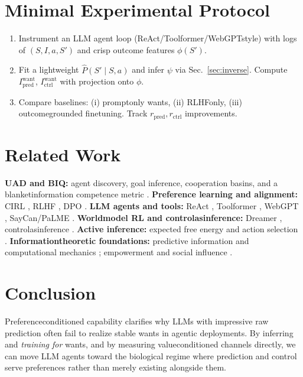 \documentclass[11pt]{article}
\begin{document}
\section{Minimal Experimental Protocol}
\label{sec:protocol}
\begin{enumerate}[leftmargin=2em]
  \item Instrument an LLM agent loop (ReAct/Toolformer/WebGPT\textendash style) with logs of $(S,I,a,S')$ and crisp outcome features $\phi(S')$.
  \item Fit a lightweight $\widehat P(S'\mid S,a)$ and infer $\psi$ via Sec.~\ref{sec:inverse}. Compute $I^{\text{want}}_{\mathrm{pred}}$, $I^{\text{want}}_{\mathrm{ctrl}}$ with projection onto $\phi$.
  \item Compare baselines: (i) prompt\textendash only wants, (ii) RLHF\textendash only, (iii) outcome\textendash grounded fine\textendash tuning. Track $r_{\mathrm{pred}}, r_{\mathrm{ctrl}}$ improvements.
\end{enumerate}

\section{Related Work}
\label{sec:related}
\textbf{UAD and B\textendash IQ:} agent discovery, goal inference, cooperation basins, and a blanket\textendash information competence metric \citep{ZarnckeUAD, ZarnckeAttractors, ZarnckeAcausal, ZarnckeBIQ}.\newline
\textbf{Preference learning and alignment:} CIRL \citep{HadfieldMenell2016}, RLHF \citep{Christiano2017}, DPO \citep{Rafailov2023}.\newline
\textbf{LLM agents and tools:} ReAct \citep{Yao2023}, Toolformer \citep{Schick2023}, WebGPT \citep{Nakano2021}, SayCan/PaLM\textendash E \citep{Ahn2022, Driess2023}.\newline
\textbf{World\textendash model RL and control\textendash as\textendash inference:} Dreamer \citep{Hafner2019, Hafner2023}, control\textendash as\textendash inference \citep{Levine2018}.\newline
\textbf{Active inference:} expected free energy and action selection \citep{Friston2010}.\newline
\textbf{Information\textendash theoretic foundations:} predictive information and computational mechanics \citep{Bialek2001, ShaliziCrutchfield2001}; empowerment and social influence \citep{Klyubin2005, SalgePolani2014, Jaques2019}.

\section{Conclusion}
Preference\textendash conditioned capability clarifies why LLMs with impressive raw prediction often fail to realize stable wants in agentic deployments. By inferring and \emph{training for} wants, and by measuring value\textendash conditioned channels directly, we can move LLM agents toward the biological regime where prediction and control serve preferences rather than merely existing alongside them.
\end{document}
